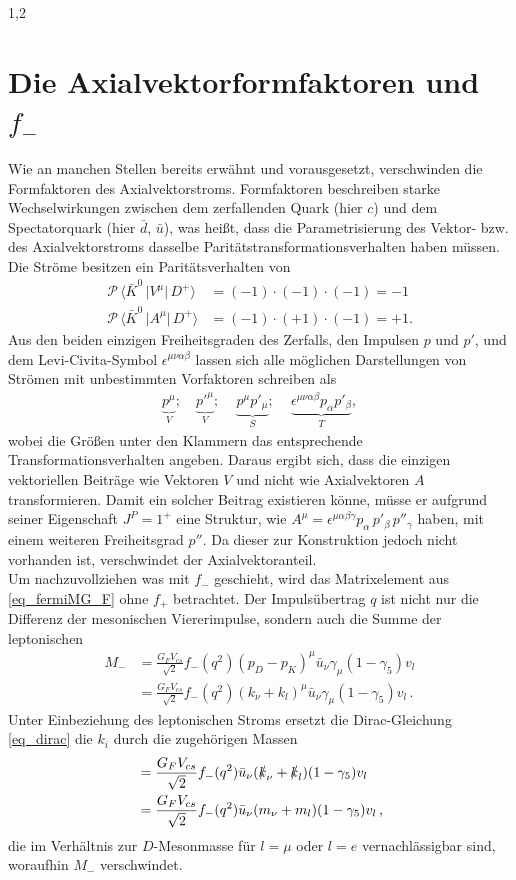 \documentclass[11pt,a4paper,twoside]{report}
\begin{document}
\begin{spacing}{1,2}
\section{Die Axialvektorformfaktoren und $f_-$}
\label{sec_AxialF-}
Wie an manchen Stellen bereits erwähnt und vorausgesetzt, verschwinden die Formfaktoren des Axialvektorstroms. Formfaktoren beschreiben starke 
Wechselwirkungen zwischen dem zerfallenden Quark (hier $c$) und dem Spectatorquark (hier $\bar d$, $\bar u$), was heißt, dass die Parametrisierung des 
Vektor- bzw. des Axialvektorstroms dasselbe Paritätstransformationsverhalten haben müssen. Die Ströme besitzen ein Paritätsverhalten von
\begin{align}
 \mathcal{P} \, \big\langle\bar K^0\,\big|V^\mu|\,D^+\big\rangle &= (-1)\cdot(-1)\cdot(-1) = -1 \nonumber \\
 \mathcal{P} \, \big\langle\bar K^0\,\big|A^\mu|\,D^+\big\rangle &= (-1)\cdot(+1)\cdot(-1) = +1. \nonumber
\end{align}
Aus den beiden einzigen Freiheitsgraden des Zerfalls, den Impulsen $p$ und $p'$, und dem Levi-Civita-Symbol $\epsilon^{\mu\nu\alpha\beta}$ lassen sich alle möglichen
Darstellungen von Strömen mit unbestimmten Vorfaktoren schreiben als
\begin{align}
 \underbrace{p^\mu}_{V} ;\quad \underbrace{p'^\mu}_{V};\quad \,\underbrace{p^\mu p'_\mu }_{S} ; \quad\,\underbrace{\epsilon^{\mu\nu\alpha\beta}p_\alpha p'_\beta}_{T},
\end{align}
wobei die Größen unter den Klammern das entsprechende Transformationsverhalten angeben. Daraus ergibt sich, dass die einzigen vektoriellen Beiträge wie 
Vektoren $V$ und nicht wie Axialvektoren $A$ transformieren. Damit ein solcher Beitrag existieren könne, müsse er aufgrund seiner Eigenschaft $J^P = 1^+$
eine Struktur, wie $A^\mu = \epsilon^{\mu\alpha\beta\gamma}p_\alpha\,p'_\beta\,p''_\gamma$ haben, mit einem weiteren Freiheitsgrad $p''$. Da dieser zur 
Konstruktion jedoch nicht vorhanden ist, verschwindet der Axialvektoranteil.\\
\noindent
Um nachzuvollziehen was mit $f_-$ geschieht, wird das Matrixelement aus \eqref{eq_fermiMG_F} ohne $f_+$ betrachtet. Der Impulsübertrag $q$ ist nicht
nur die Differenz der mesonischen Viererimpulse, sondern auch die Summe der leptonischen
\begin{align}
 M_- &= \frac{G_F V_{cs}}{\sqrt{2}} f_-(q^2)(p_D-p_K)^\mu\bar u_\nu \gamma_\mu(1-\gamma_5)v_l\nonumber\\
 &= \frac{G_F V_{cs}}{\sqrt{2}} f_-(q^2)(k_\nu+k_l)^\mu \bar u_\nu \gamma_\mu(1-\gamma_5)v_l\,.\nonumber
\end{align}
Unter Einbeziehung des leptonischen Stroms ersetzt die Dirac-Gleichung \eqref{eq_dirac} die $k_i$ durch die zugehörigen Massen
\begin{align}
 &=\frac{G_F V_{cs}}{\sqrt{2}} f_-(q^2)\bar u_\nu (\slashed{k}_\nu + \slashed{k}_l) (1-\gamma_5)v_l\nonumber\\
 &=\frac{G_F V_{cs}}{\sqrt{2}} f_-(q^2)\bar u_\nu (m_\nu + m_l) (1-\gamma_5)v_l\,,\nonumber 
 \end{align}
die im Verhältnis zur $D$-Mesonmasse für $l=\mu$ oder $l=e$ vernachlässigbar sind, wo\-raufhin $M_-$ verschwindet.


\end{spacing}
\end{document}
